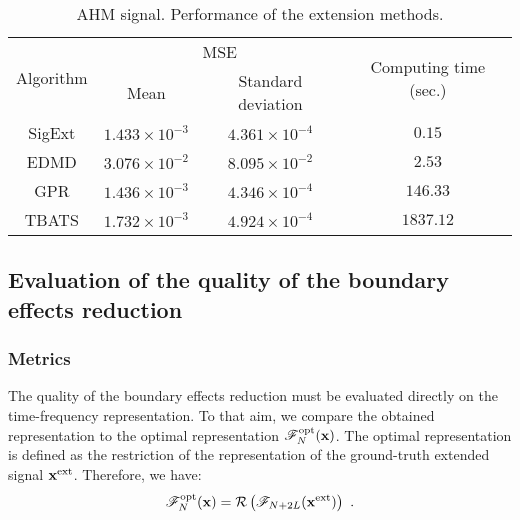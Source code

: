 \begin{table}
\centering
\caption{AHM signal. Performance of the extension methods.}
\begin{tabular}{|c||c|c|c|}
  \hline
   \multirow{2}{*}{Algorithm} & \multicolumn{2}{c|}{MSE}  & \multirow{2}{41pt}{Computing time (sec.)} \\
   \cline{2-3} & Mean & Standard deviation & \\
   \hhline{|=#=|=|=|}
   {\sf SigExt} & $1.433\times 10^{-3}$ & $4.361\times 10^{-4}$ & $0.15$ \\
   \hline
   EDMD & $3.076\times 10^{-2}$ & $8.095\times 10^{-2}$ & $2.53$\\
   \hline
   GPR & $1.436\times 10^{-3}$ & $4.346\times 10^{-4}$ & $146.33$ \\
   \hline
   TBATS & $1.732\times 10^{-3}$ & $4.924\times 10^{-4}$ & $1837.12$ \\
   \hline
\end{tabular}
\label{tab:mse.sine}
\end{table} 


\subsection{Evaluation of the quality of the boundary effects reduction}

\subsubsection{Metrics}
The quality of the boundary effects reduction must be evaluated directly on the time-frequency representation. To that aim, we compare the obtained representation to the optimal representation ${\mathscr F}_N^\mathrm{opt}({\mathbf x})$. The optimal representation is defined as the restriction of the representation of the ground-truth extended signal ${\mathbf x}^\mathrm{ext}$. Therefore, we have:
\begin{equation*}
{\mathscr F}_N^\mathrm{opt}({\mathbf x}) = {\mathcal R}\left( {\mathscr F}_{N+2L}({\mathbf x}^\mathrm{ext}) \right) \ .
\end{equation*} 

